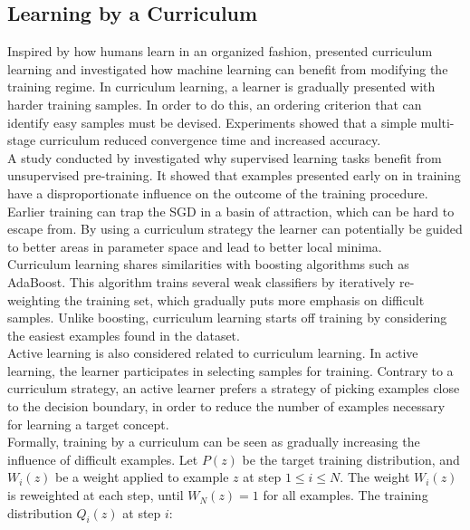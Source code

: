 
\subsection{Learning by a Curriculum}
Inspired by how humans learn in an organized fashion, \cite{Bengio_curriculumlearning} presented curriculum learning and investigated how machine learning can benefit from modifying the training regime. In curriculum learning, a learner is gradually presented with harder training samples. In order to do this, an ordering criterion that can identify easy samples must be devised. Experiments showed that a simple multi-stage curriculum reduced convergence time and increased accuracy. \\

A study conducted by \cite{Erhan-unsupervised-pre-training} investigated why supervised learning tasks benefit from unsupervised pre-training. It showed that examples presented early on in training have a disproportionate influence on the outcome of the training procedure. Earlier training can trap the \ac{SGD} in a basin of attraction, which can be hard to escape from.  By using a curriculum strategy the learner can potentially be guided to better areas in parameter space and lead to better local minima. \\

Curriculum learning shares similarities with boosting algorithms such as AdaBoost. This algorithm trains several weak classifiers by iteratively re-weighting the training set, which gradually puts more emphasis on difficult samples. Unlike boosting, curriculum learning starts off training by considering the easiest examples found in the dataset.\\

Active learning \citep{Cohn_active_learning} is also considered related to curriculum learning. In active learning, the learner participates in selecting samples for training. Contrary to a curriculum strategy, an active learner prefers a strategy of picking examples close to the decision boundary, in order to reduce the number of examples necessary for learning a target concept.\\

Formally, training by a curriculum can be seen as gradually increasing the influence of difficult examples. Let $P(z)$ be the target training distribution, and $W_{i}(z)$ be a weight applied to example $z$ at step $1\leq i\leq N$. The weight $W_{i}(z)$ is reweighted at each step, until $W_{N}(z) = 1$ for all examples.  The training distribution  $Q_{i}(z)$ at step $i$:

